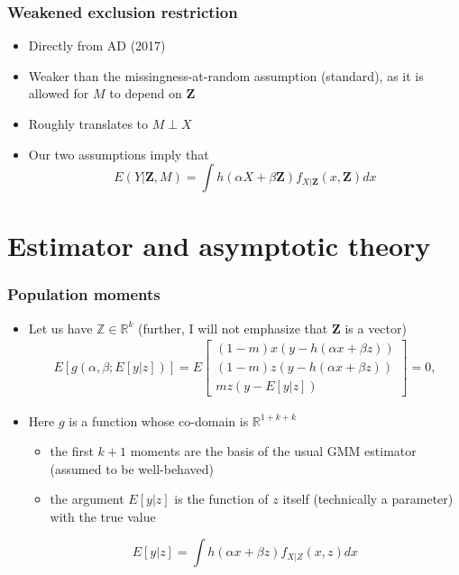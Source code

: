 \documentclass[compress,mathserif]{beamer}
\begin{document}
\begin{frame}\frametitle{Weakened exclusion restriction}\hypertarget{Weakened exclusion restriction}{}
\begin{itemize}
\item Directly from AD (2017)

\item Weaker than the missingness-at-random assumption (standard), as it is allowed for $M$ to depend on $\mathbf{Z}$

\item Roughly translates to $M \perp X$

\item Our two assumptions imply that
\[E(Y| \mathbf{Z}, M)= \int h(\alpha X+\beta \mathbf{Z})  f_{X|\mathbf{Z}}(x,\mathbf{Z}) dx
\]


\end{itemize}
\end{frame}







\section{Estimator and asymptotic theory}\hypertarget{Estimator and asymptotic theory}{}


\begin{frame}\frametitle{Population moments}\hypertarget{Population moments}{}
\begin{itemize}
\item Let us have $\mathbb{Z} \in \mathbb{R}^k$ (further, I will not emphasize that $\mathbf{Z}$ is a vector)
\begin{align*}
    E[g(\alpha,\beta; E[y|z])]=E\left[\begin{array}{c}
        (1-m) x(y- h(\alpha x + \beta z))  \\
        (1-m) z(y- h(\alpha x + \beta z)) \\
          m z(y- E[y|z])
    \end{array}\right]=0,
\end{align*}

\item Here $g$ is a function whose co-domain is $\mathbb{R}^{1+k+k}$
\begin{itemize}
\item the first $k+1$ moments are the basis of the usual GMM estimator (assumed to be well-behaved)

\item the argument $E[y|z]$ is the function of $z$ itself (technically a parameter) with the true value
\end{itemize}

\[E[y|z] = \int h(\alpha x + \beta z) f_{X|Z}(x,z) dx
\]


\end{itemize}
\end{frame}
\end{document}
